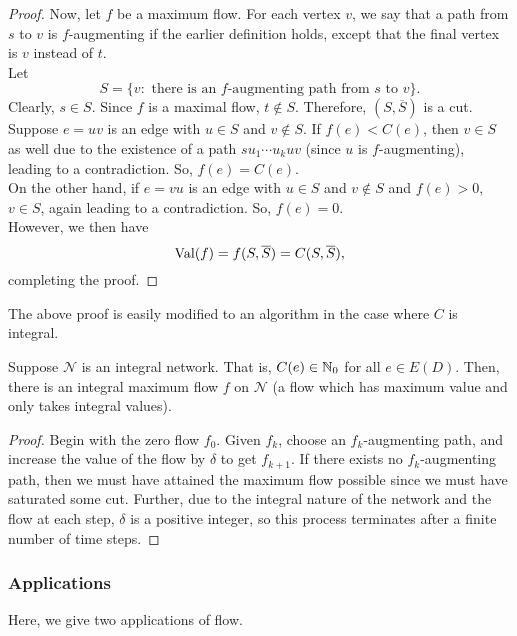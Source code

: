 \begin{proof}
				Now, let $f$ be a maximum flow. For each vertex $v$, we say that a path from $s$ to $v$ is $f$-augmenting if the earlier definition holds, except that the final vertex is $v$ instead of $t$.\\
				Let
				\[ S = \{ v: \text{ there is an $f$-augmenting path from $s$ to $v$} \}. \]
				Clearly, $s\in S$. Since $f$ is a maximal flow, $t\not\in S$. Therefore, $(S,\overline{S})$ is a cut.\\
				Suppose $e = uv$ is an edge with $u \in S$ and $v \not\in S$. If $f(e) < C(e)$, then $v\in S$ as well due to the existence of a path $s u_1 \cdots u_k u v$ (since $u$ is $f$-augmenting), leading to a contradiction. So, $f(e) = C(e)$.\\
				On the other hand, if $e = vu$ is an edge with $u \in S$ and $v \not\in S$ and $f(e) > 0$, $v \in S$, again leading to a contradiction. So, $f(e) = 0$.\\
				However, we then have
				\[ \operatorname{Val}(f) = f(S,\overline{S}) = C(S,\overline{S}), \]
				completing the proof.
			\end{proof}

			The above proof is easily modified to an algorithm in the case where $C$ is integral.

			\begin{fcor}
				\label{integral network integral maxflow}
				Suppose $\mathcal{N}$ is an integral network. That is, $C(e) \in \mathbb{N}_0$ for all $e \in E(D)$. Then, there is an integral maximum flow $f$ on $\mathcal{N}$ (a flow which has maximum value and only takes integral values).
			\end{fcor}
			\begin{proof}
				Begin with the zero flow $f_0$. Given $f_k$, choose an $f_k$-augmenting path, and increase the value of the flow by $\delta$ to get $f_{k+1}$. If there exists no $f_k$-augmenting path, then we must have attained the maximum flow possible since we must have saturated some cut. Further, due to the integral nature of the network and the flow at each step, $\delta$ is a positive integer, so this process terminates after a finite number of time steps.
			\end{proof}

		\subsubsection{Applications}
		\label{subsubsec: applications of max-flow}

			Here, we give two applications of flow.\\

